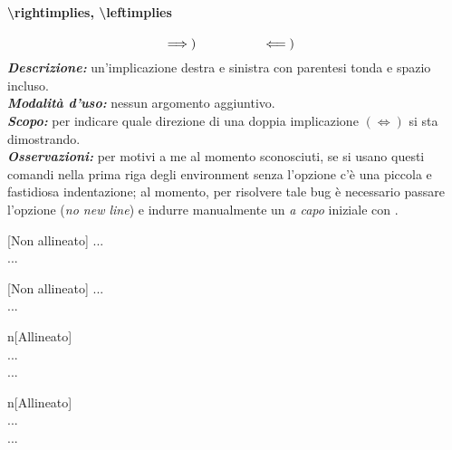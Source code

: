 \paragraph{\textbackslash rightimplies, \textbackslash leftimplies}
\begin{equation*}
	\implies)\quad\qquad\qquad\impliedby)\quad
\end{equation*}
\textbf{\textit{Descrizione:}} un'implicazione destra e sinistra con parentesi tonda e spazio incluso.\\
\textbf{\textit{Modalità d'uso:}} nessun argomento aggiuntivo.\\
\textbf{\textit{Scopo:}} per indicare quale direzione di una doppia implicazione $(\iff)$ si sta dimostrando.\\
\textbf{\textit{Osservazioni:}} per motivi a me al momento sconosciuti, se si usano questi comandi nella prima riga degli environment senza l'opzione  c'è una piccola e fastidiosa indentazione; al momento, per risolvere tale bug è necessario passare l'opzione  (\textit{no new line}) e indurre manualmente un \textit{a capo} iniziale con \inlinecode{$\sim$\{\}\textbackslash\textbackslash}.%
\begin{example}{}[Non allineato]
\rightimplies ...\\
\leftimplies ...
\end{example}
\begin{codelatex}
\begin{example}{}[Non allineato]
	\rightimplies ...\\
	\leftimplies ...
\end{example}
\end{codelatex}
\begin{example}{n}[Allineato]
	~{}\\
	\rightimplies ...\\
	\leftimplies ...
\end{example}
\begin{codelatex}[Allineato]
\begin{example}{n}[Allineato]
~{}\\
\rightimplies ...\\
\leftimplies ...
\end{example}
\end{codelatex}
